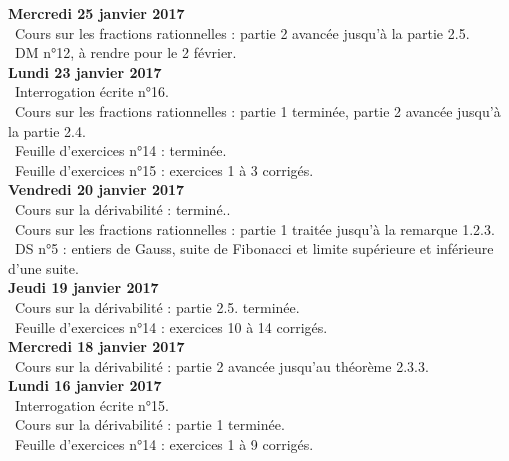\documentclass[12pt,a4paper]{article}
\begin{document}
\noindent\textbf{Mercredi 25 janvier 2017}\\
\bu\ Cours sur les fractions rationnelles : partie 2 avancée jusqu'à la partie 2.5.\\
\bu\ DM n°12, à rendre pour le 2 février.\vspace{.4cm}\\

\noindent\textbf{Lundi 23 janvier 2017}\\
\bu\ Interrogation écrite n°16.\\
\bu\ Cours sur les fractions rationnelles : partie 1 terminée, partie 2 avancée jusqu'à la partie 2.4.\\
\bu\ Feuille d'exercices n°14 : terminée.\\
\bu\ Feuille d'exercices n°15 : exercices 1 à 3 corrigés.\vspace{.4cm}\\

\noindent\textbf{Vendredi 20 janvier 2017}\\
\bu\ Cours sur la dérivabilité : terminé..\\
\bu\ Cours sur les fractions rationnelles : partie 1 traitée jusqu'à la remarque 1.2.3.\\
\bu\ DS n°5 : entiers de Gauss, suite de Fibonacci et limite supérieure et inférieure d'une suite.\vspace{.4cm}\\

\noindent\textbf{Jeudi 19 janvier 2017}\\
\bu\ Cours sur la dérivabilité : partie 2.5. terminée.\\
\bu\ Feuille d'exercices n°14 : exercices 10 à 14 corrigés.\vspace{.4cm}\\

\noindent\textbf{Mercredi 18 janvier 2017}\\
\bu\ Cours sur la dérivabilité : partie 2 avancée jusqu'au théorème 2.3.3.\vspace{.4cm}\\

\noindent\textbf{Lundi 16 janvier 2017}\\
\bu\ Interrogation écrite n°15.\\
\bu\ Cours sur la dérivabilité : partie 1 terminée.\\
\bu\ Feuille d'exercices n°14 : exercices 1 à 9 corrigés. \vspace{.4cm}\\
\end{document}
